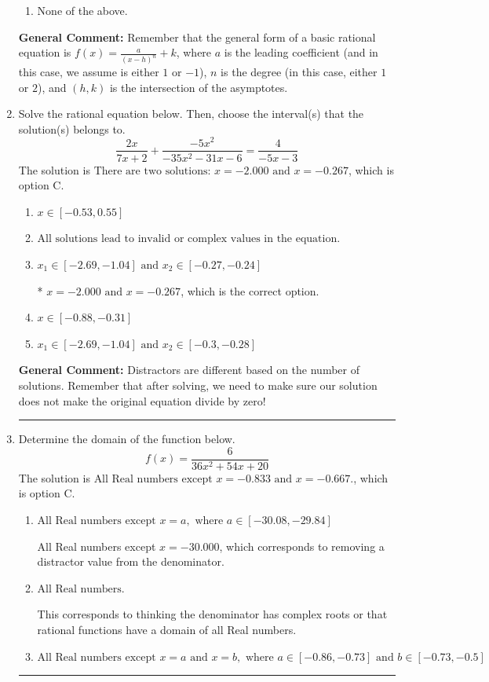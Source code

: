 \documentclass{extbook}[14pt]
\newcommand{\litem}[1]{\item #1

\rule{\textwidth}{0.4pt}}
\begin{document}
\begin{enumerate}
{\begin{enumerate}[label=\Alph*.]
\begin{multicols}{2}
\end{multicols}\item None of the above.\end{enumerate}
\textbf{General Comment:} Remember that the general form of a basic rational equation is $ f(x) = \frac{a}{(x-h)^n} + k$, where $a$ is the leading coefficient (and in this case, we assume is either $1$ or $-1$), $n$ is the degree (in this case, either $1$ or $2$), and $(h, k)$ is the intersection of the asymptotes.
}
\litem{
Solve the rational equation below. Then, choose the interval(s) that the solution(s) belongs to.
\[ \frac{2x}{7x + 2} + \frac{-5x^{2}}{-35x^{2} -31 x -6} = \frac{4}{-5x -3} \]The solution is \( \text{There are two solutions: } x = -2.000 \text{ and } x = -0.267 \), which is option C.\begin{enumerate}[label=\Alph*.]
\item \( x \in [-0.53,0.55] \)


\item \( \text{All solutions lead to invalid or complex values in the equation.} \)


\item \( x_1 \in [-2.69, -1.04] \text{ and } x_2 \in [-0.27,-0.24] \)

* $x = -2.000 \text{ and } x = -0.267$, which is the correct option.
\item \( x \in [-0.88,-0.31] \)


\item \( x_1 \in [-2.69, -1.04] \text{ and } x_2 \in [-0.3,-0.28] \)


\end{enumerate}

\textbf{General Comment:} Distractors are different based on the number of solutions. Remember that after solving, we need to make sure our solution does not make the original equation divide by zero!
}
\litem{
Determine the domain of the function below.
\[ f(x) = \frac{6}{36x^{2} +54 x + 20} \]The solution is \( \text{All Real numbers except } x = -0.833 \text{ and } x = -0.667. \), which is option C.\begin{enumerate}[label=\Alph*.]
\item \( \text{All Real numbers except } x = a, \text{ where } a \in [-30.08, -29.84] \)

All Real numbers except $x = -30.000$, which corresponds to removing a distractor value from the denominator.
\item \( \text{All Real numbers.} \)

This corresponds to thinking the denominator has complex roots or that rational functions have a domain of all Real numbers.
\item \( \text{All Real numbers except } x = a \text{ and } x = b, \text{ where } a \in [-0.86, -0.73] \text{ and } b \in [-0.73, -0.5] \)


\end{enumerate}}
\end{enumerate}
\end{document}
